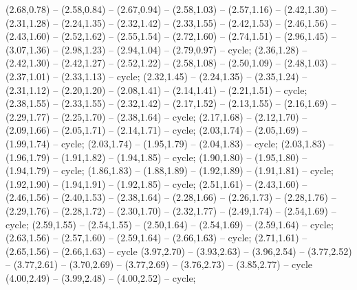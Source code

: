 { (2.68,0.78) -- (2.58,0.84) -- (2.67,0.94) -- (2.58,1.03) -- (2.57,1.16) -- (2.42,1.30) -- (2.31,1.28) -- (2.24,1.35) -- (2.32,1.42) -- (2.33,1.55) -- (2.42,1.53) -- (2.46,1.56) -- (2.43,1.60) -- (2.52,1.62) -- (2.55,1.54) -- (2.72,1.60) -- (2.74,1.51) -- (2.96,1.45) -- (3.07,1.36) -- (2.98,1.23) -- (2.94,1.04) -- (2.79,0.97) -- cycle;
 (2.36,1.28) -- (2.42,1.30) -- (2.42,1.27) -- (2.52,1.22) -- (2.58,1.08) -- (2.50,1.09) -- (2.48,1.03) -- (2.37,1.01) -- (2.33,1.13) -- cycle;
 (2.32,1.45) -- (2.24,1.35) -- (2.35,1.24) -- (2.31,1.12) -- (2.20,1.20) -- (2.08,1.41) -- (2.14,1.41) -- (2.21,1.51) -- cycle;
 (2.38,1.55) -- (2.33,1.55) -- (2.32,1.42) -- (2.17,1.52) -- (2.13,1.55) -- (2.16,1.69) -- (2.29,1.77) -- (2.25,1.70) -- (2.38,1.64) -- cycle;
 (2.17,1.68) -- (2.12,1.70) -- (2.09,1.66) -- (2.05,1.71) -- (2.14,1.71) -- cycle;
 (2.03,1.74) -- (2.05,1.69) -- (1.99,1.74) -- cycle;
 (2.03,1.74) -- (1.95,1.79) -- (2.04,1.83) -- cycle;
 (2.03,1.83) -- (1.96,1.79) -- (1.91,1.82) -- (1.94,1.85) -- cycle;
 (1.90,1.80) -- (1.95,1.80) -- (1.94,1.79) -- cycle;
 (1.86,1.83) -- (1.88,1.89) -- (1.92,1.89) -- (1.91,1.81) -- cycle;
 (1.92,1.90) -- (1.94,1.91) -- (1.92,1.85) -- cycle;
 (2.51,1.61) -- (2.43,1.60) -- (2.46,1.56) -- (2.40,1.53) -- (2.38,1.64) -- (2.28,1.66) -- (2.26,1.73) -- (2.28,1.76) -- (2.29,1.76) -- (2.28,1.72) -- (2.30,1.70) -- (2.32,1.77) -- (2.49,1.74) -- (2.54,1.69) -- cycle;
 (2.59,1.55) -- (2.54,1.55) -- (2.50,1.64) -- (2.54,1.69) -- (2.59,1.64) -- cycle;
 (2.63,1.56) -- (2.57,1.60) -- (2.59,1.64) -- (2.66,1.63) -- cycle;
 (2.71,1.61) -- (2.65,1.56) -- (2.66,1.63) -- cycle (3.97,2.70) -- (3.93,2.63) -- (3.96,2.54) -- (3.77,2.52) -- (3.77,2.61) -- (3.70,2.69) -- (3.77,2.69) -- (3.76,2.73) -- (3.85,2.77) -- cycle (4.00,2.49) -- (3.99,2.48) -- (4.00,2.52) -- cycle;
}
